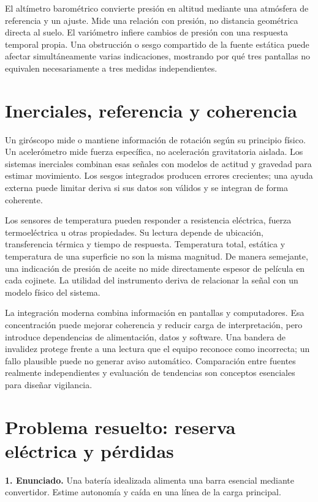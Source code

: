 El altímetro barométrico convierte presión en altitud mediante una atmósfera de referencia y un ajuste. Mide una relación con presión, no distancia geométrica directa al suelo. El variómetro infiere cambios de presión con una respuesta temporal propia. Una obstrucción o sesgo compartido de la fuente estática puede afectar simultáneamente varias indicaciones, mostrando por qué tres pantallas no equivalen necesariamente a tres medidas independientes.

\section{Inerciales, referencia y coherencia}
Un giróscopo mide o mantiene información de rotación según su principio físico. Un acelerómetro mide fuerza específica, no aceleración gravitatoria aislada. Los sistemas inerciales combinan esas señales con modelos de actitud y gravedad para estimar movimiento. Los sesgos integrados producen errores crecientes; una ayuda externa puede limitar deriva si sus datos son válidos y se integran de forma coherente.

Los sensores de temperatura pueden responder a resistencia eléctrica, fuerza termoeléctrica u otras propiedades. Su lectura depende de ubicación, transferencia térmica y tiempo de respuesta. Temperatura total, estática y temperatura de una superficie no son la misma magnitud. De manera semejante, una indicación de presión de aceite no mide directamente espesor de película en cada cojinete. La utilidad del instrumento deriva de relacionar la señal con un modelo físico del sistema.

La integración moderna combina información en pantallas y computadores. Esa concentración puede mejorar coherencia y reducir carga de interpretación, pero introduce dependencias de alimentación, datos y software. Una bandera de invalidez protege frente a una lectura que el equipo reconoce como incorrecta; un fallo plausible puede no generar aviso automático. Comparación entre fuentes realmente independientes y evaluación de tendencias son conceptos esenciales para diseñar vigilancia.

\section{Problema resuelto: reserva eléctrica y pérdidas}
\textbf{1. Enunciado.} Una batería idealizada alimenta una barra esencial mediante convertidor. Estime autonomía y caída en una línea de la carga principal.

